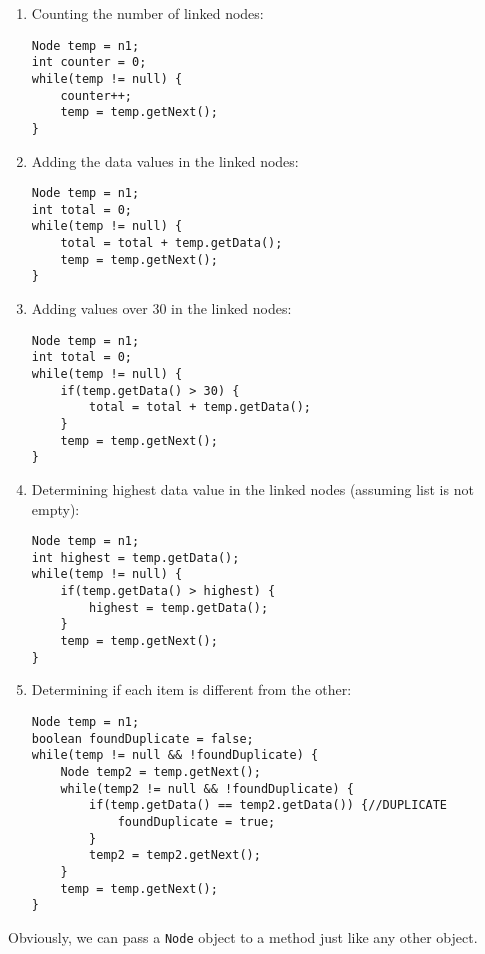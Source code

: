 \begin{enumerate}
\item Counting the number of linked nodes:
\begin{lstlisting}
Node temp = n1;
int counter = 0;
while(temp != null) {
	counter++;
	temp = temp.getNext();
}
\end{lstlisting}

\item Adding the data values in the linked nodes:
\begin{lstlisting}
Node temp = n1;
int total = 0;
while(temp != null) {
	total = total + temp.getData();
	temp = temp.getNext();
}
\end{lstlisting}

\item Adding values over 30 in the linked nodes:
\begin{lstlisting}
Node temp = n1;
int total = 0;
while(temp != null) {
	if(temp.getData() > 30) {
		total = total + temp.getData();
	}
	temp = temp.getNext();
}
\end{lstlisting}

\newpage

\item Determining highest data value in the linked nodes (assuming list is not empty):
\begin{lstlisting}
Node temp = n1;
int highest = temp.getData();
while(temp != null) {
	if(temp.getData() > highest) {
		highest = temp.getData();
	}
	temp = temp.getNext();
}
\end{lstlisting}

\item Determining if each item is different from the other:
\begin{lstlisting}[linewidth=14cm]
Node temp = n1;
boolean foundDuplicate = false; 
while(temp != null && !foundDuplicate) {
	Node temp2 = temp.getNext();
	while(temp2 != null && !foundDuplicate) {
		if(temp.getData() == temp2.getData()) {//DUPLICATE
			foundDuplicate = true; 
		}
		temp2 = temp2.getNext();
	}
	temp = temp.getNext();
}
\end{lstlisting}
\end{enumerate}

\newpage

Obviously, we can pass a \texttt{Node} object to a method just like any other object.

